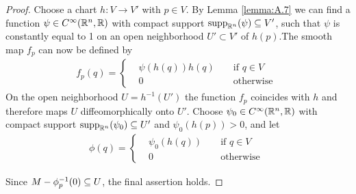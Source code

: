 \begin{proof}
  Choose a chart $h: V\to V'$ with $p\in V$. By Lemma \ref{lemma:A.7} we can find a
function $\psi\in C^\infty(\mathbb{R}^n, \mathbb{R})$ with compact support $\mathrm{supp}_{\mathbb{R}^n}(\psi)\subseteq V'$, 
such that $\psi$ is constantly equal to 1 on an open neighborhood $U'\subset V'$ of $h(p)$.The 
smooth map $f_p$ can now be defined by
\begin{align*}
  f_p(q) = \left\{\begin{aligned}
    & \psi(h(q))h(q) && \text{ if } q\in V \\
    & 0 && \text{ otherwise }
  \end{aligned}\right.
\end{align*}
On the open neighborhood $U = h^{-1}(U')$ the function $f_p$ coincides with $h$ and
therefore maps $U$ diffeomorphically onto $U'$. Choose $\psi_0\in C^\infty(\mathbb{R}^n, \mathbb{R})$ with
compact support $\mathrm{supp}_{\mathbb{R}^n}(\psi_0)\subseteq U'$ and $\psi_0(h(p))>0$, and let
\begin{align*}
  \phi(q) = \left\{\begin{aligned}
    & \psi_0(h(q)) && \text{ if } q\in V \\
    & 0 && \text{ otherwise }
  \end{aligned}\right.
\end{align*}

Since $M-\phi_p^{-1}(0)\subseteq U$, the final assertion holds.
\end{proof}

